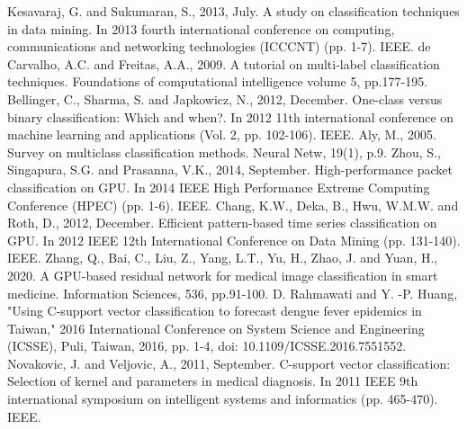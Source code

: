 \documentclass[conference]{IEEEtran}
\begin{document}
\begin{thebibliography}{00}
Kesavaraj, G. and Sukumaran, S., 2013, July. A study on classification techniques in data mining. In 2013 fourth international conference on computing, communications and networking technologies (ICCCNT) (pp. 1-7). IEEE.
de Carvalho, A.C. and Freitas, A.A., 2009. A tutorial on multi-label classification techniques. Foundations of computational intelligence volume 5, pp.177-195.
Bellinger, C., Sharma, S. and Japkowicz, N., 2012, December. One-class versus binary classification: Which and when?. In 2012 11th international conference on machine learning and applications (Vol. 2, pp. 102-106). IEEE.
Aly, M., 2005. Survey on multiclass classification methods. Neural Netw, 19(1), p.9.
Zhou, S., Singapura, S.G. and Prasanna, V.K., 2014, September. High-performance packet classification on GPU. In 2014 IEEE High Performance Extreme Computing Conference (HPEC) (pp. 1-6). IEEE.
Chang, K.W., Deka, B., Hwu, W.M.W. and Roth, D., 2012, December. Efficient pattern-based time series classification on GPU. In 2012 IEEE 12th International Conference on Data Mining (pp. 131-140). IEEE.
Zhang, Q., Bai, C., Liu, Z., Yang, L.T., Yu, H., Zhao, J. and Yuan, H., 2020. A GPU-based residual network for medical image classification in smart medicine. Information Sciences, 536, pp.91-100.
D. Rahmawati and Y. -P. Huang, "Using C-support vector classification to forecast dengue fever epidemics in Taiwan," 2016 International Conference on System Science and Engineering (ICSSE), Puli, Taiwan, 2016, pp. 1-4, doi: 10.1109/ICSSE.2016.7551552.
Novakovic, J. and Veljovic, A., 2011, September. C-support vector classification: Selection of kernel and parameters in medical diagnosis. In 2011 IEEE 9th international symposium on intelligent systems and informatics (pp. 465-470). IEEE.

\end{thebibliography}
\end{document}
